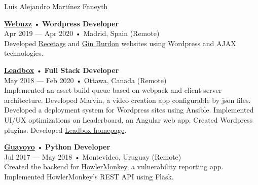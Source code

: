 \documentclass[12pt]{article}
\begin{document}
\begin{cv}{Luis Alejandro Mart\'inez Faneyth}
\begin{minipage}[t]{0.55\textwidth}
{    }\vspace{0.125em}
    \parbox[t]{\linewidth}{
      \textbf{\href{https://web.archive.org/web/20180413143616/https://webuzz.es/}{Webuzz}} • \textrm{\textbf{Wordpress Developer}}\\
      Apr 2019 --- Apr 2020 • Madrid, Spain (Remote)\\
      \footnotesize{Developed \href{https://web.archive.org/web/20201101021046/https://www.recetags.com/}{Recetags} and \href{https://web.archive.org/web/20191206145303/https://www.ginburdon.com/}{Gin Burdon} websites using Wordpress and AJAX technologies.}\\
    }\vspace{0.125em}
    \parbox[t]{\linewidth}{
      \textbf{\href{https://leadboxhq.com}{Leadbox}} • \textrm{\textbf{Full Stack Developer}}\\
      May 2018 --- Feb 2020 • Ottawa, Canada (Remote)\\
      \footnotesize{Implemented an asset build queue based on webpack and client-server architecture. Developed Marvin, a video creation app configurable by json files. Developed a deployment system for Wordpress sites using Ansible. Implemented UI/UX optimizations on Leaderboard, an Angular web app. Created Wordpress plugins. Developed \href{https://leadboxhq.com}{Leadbox homepage}.}\\
    }\vspace{0.125em}
    \parbox[t]{\linewidth}{
      \textbf{\href{https://guayoyo.io}{Guayoyo}} • \textrm{\textbf{Python Developer}}\\
      Jul 2017 --- May 2018 • Montevideo, Uruguay (Remote)\\
      \footnotesize{Created the backend for \href{https://howlermonkey.io}{HowlerMonkey}, a vulnerability reporting app. Implemented HowlerMonkey's REST API using Flask.}\\
    }\vspace{0.125em}

\end{minipage}
\end{cv}
\end{document}
